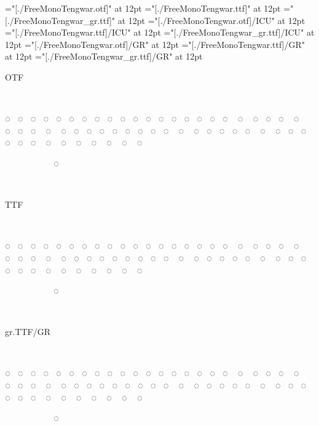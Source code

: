 

\font\opentype   ="[./FreeMonoTengwar.otf]" at 12pt
\font\truetype   ="[./FreeMonoTengwar.ttf]" at 12pt
\font\graphite   ="[./FreeMonoTengwar_gr.ttf]" at 12pt
\font\opentypeicu="[./FreeMonoTengwar.otf]/ICU" at 12pt
\font\truetypeicu="[./FreeMonoTengwar.ttf]/ICU" at 12pt
\font\graphiteicu="[./FreeMonoTengwar_gr.ttf]/ICU" at 12pt
\font\opentypegr ="[./FreeMonoTengwar.otf]/GR" at 12pt
\font\truetypegr ="[./FreeMonoTengwar.ttf]/GR" at 12pt
\font\graphitegr ="[./FreeMonoTengwar_gr.ttf]/GR" at 12pt

\opentype OTF

                          

◌ ◌ ◌ ◌ ◌ ◌ ◌ ◌ ◌ ◌ ◌ ◌ ◌ ◌ ◌ ◌ ◌ ◌ ◌ ◌ ◌ ◌ ◌ ◌ ◌ ◌ ◌ ◌ ◌ ◌ ◌ ◌ ◌ ◌ ◌ ◌ ◌ ◌ ◌ ◌ ◌ ◌ ◌ ◌ ◌ ◌ ◌ ◌ ◌ ◌ ◌ ◌ ◌ ◌ ◌ ◌

      ◌‍ ‍ ‍ ‍

~

\truetype TTF

                          

◌ ◌ ◌ ◌ ◌ ◌ ◌ ◌ ◌ ◌ ◌ ◌ ◌ ◌ ◌ ◌ ◌ ◌ ◌ ◌ ◌ ◌ ◌ ◌ ◌ ◌ ◌ ◌ ◌ ◌ ◌ ◌ ◌ ◌ ◌ ◌ ◌ ◌ ◌ ◌ ◌ ◌ ◌ ◌ ◌ ◌ ◌ ◌ ◌ ◌ ◌ ◌ ◌ ◌ ◌ ◌

      ◌‍ ‍ ‍ ‍

~

\graphitegr gr.TTF/GR

                          

◌ ◌ ◌ ◌ ◌ ◌ ◌ ◌ ◌ ◌ ◌ ◌ ◌ ◌ ◌ ◌ ◌ ◌ ◌ ◌ ◌ ◌ ◌ ◌ ◌ ◌ ◌ ◌ ◌ ◌ ◌ ◌ ◌ ◌ ◌ ◌ ◌ ◌ ◌ ◌ ◌ ◌ ◌ ◌ ◌ ◌ ◌ ◌ ◌ ◌ ◌ ◌ ◌ ◌ ◌ ◌

      ◌‍ ‍ ‍ ‍

~

